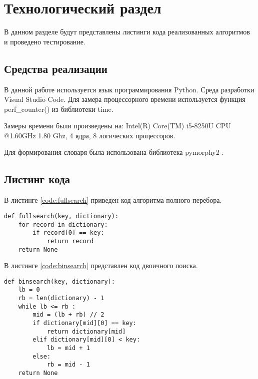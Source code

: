 \chapter{Технологический раздел}
\label{cha:impl}
В данном разделе будут представлены листинги кода реализованных алгоритмов и проведено тестирование.

\section{Средства реализации}
\label{sec:realisation}
В данной работе используется язык программирования Python. Среда разработки Visual Studio Code. Для замера процессорного времени используется функция perf\_counter() из библиотеки time.
\par Замеры времени были произведены на: Intel(R) Core(TM) i5-8250U CPU @1.60GHz 1.80 Ghz, 4 ядра, 8 логических процессоров.
\par Для формирования словаря была использована библиотека pymorphy2 \cite{pymorphy}.

\section{Листинг кода}
\label{sec:listings}
В листинге \ref{code:fullsearch} приведен код алгоритма полного перебора.
\begin{lstlisting}[caption= Алгоритм полного перебора, label=code:fullsearch]
def fullsearch(key, dictionary):
	for record in dictionary:
		if record[0] == key:
			return record
	return None
\end{lstlisting}

\par В листинге \ref{code:binsearch} представлен код двоичного поиска.
\begin{lstlisting}[caption= Муравьиный алгоритм, label=code:binsearch]
def binsearch(key, dictionary):
	lb = 0
	rb = len(dictionary) - 1
	while lb <= rb :
		mid = (lb + rb) // 2
		if dictionary[mid][0] == key:
			return dictionary[mid]
		elif dictionary[mid][0] < key:
			lb = mid + 1
		else:
			rb = mid - 1
	return None
\end{lstlisting}

